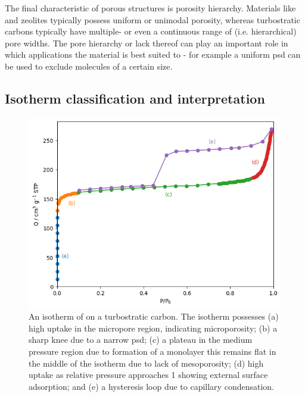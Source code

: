 The final characteristic of porous structures is porosity hierarchy. Materials like  and zeolites typically possess uniform or unimodal porosity,\citep{WeitkampZeolites, Siriwardane2005Adsorption, Ding2019Carbon, lin2009hydrogen} whereas \glspl{turbostratic carbon} typically have multiple- or even a continuous range of (i.e. hierarchical) pore widths.\citep{Li2020Hierarchical, Sevilla2014Energy, Xia2008Hierarchical, Balahmar2017Biomass} The pore hierarchy or lack thereof can play an important role in which applications the material is best suited to - for example a uniform \acrfull{psd} can be used to exclude molecules of a certain size.\citep{qian2020mof, reid2001adsorption, Adeniran2014family}

\subsection{Isotherm classification and interpretation}
\label{ss:iso_interpretation}

\begin{figure}[hb!]
    \centering
    \includegraphics[width=\columnwidth, keepaspectratio]{1-introduction/figs/isotherm_anatomy.png}
    \caption{An isotherm of  on a turbostratic carbon. The isotherm possesses (a) high uptake in the micropore region, indicating microporosity; (b) a sharp knee due to a narrow \acrshort{psd}; (c) a plateau in the medium pressure region due to formation of a monolayer this remains flat in the middle of the isotherm due to lack of mesoporosity; (d) high uptake as relative pressure approaches 1 showing external surface adsorption; and (e) a hysteresis loop due to capillary condensation.}
    \label{fig:isotherm_anatomy}
\end{figure}

